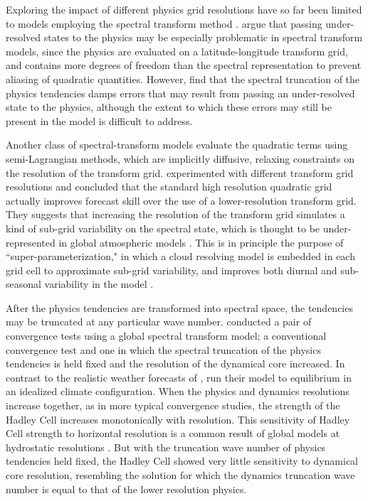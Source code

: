 \documentclass{agujournal}
\begin{document}
Exploring the impact of different physics grid resolutions have so far been limited to models employing the spectral transform method \citep{LH1997MWR,W1999T,W2014PTRSL}. \cite{LH1997MWR} argue that passing under-resolved states to the physics may be especially problematic in spectral transform models, since the physics are evaluated on a latitude-longitude transform grid, and contains more degrees of freedom than the spectral representation to prevent aliasing of quadratic quantities. However, \cite{LH1997MWR} find that the spectral truncation of the physics tendencies damps errors that may result from passing an under-resolved state to the physics, although the extent to which these errors may still be present in the model is difficult to address. 

Another class of spectral-transform models evaluate the quadratic terms using semi-Lagrangian methods, which are implicitly diffusive, relaxing constraints on the resolution of the transform grid. \cite{W2014PTRSL} experimented with different transform grid resolutions and concluded that the standard high resolution quadratic grid actually improves forecast skill over the use of a lower-resolution transform grid. They suggests that increasing the resolution of the transform grid simulates a kind of sub-grid variability on the spectral state, which is thought to be under-represented in global atmospheric models \citep{S2005QJR}. This is in principle the purpose of ``super-parameterization," in which a cloud resolving model is embedded in each grid cell to approximate sub-grid variability, and improves both diurnal and sub-seasonal variability in the model \citep{RKAG2003BAMS}.

After the physics tendencies are transformed into spectral space, the tendencies may be truncated at any particular wave number. \cite{W1999T} conducted a pair of convergence tests using a global spectral transform model; a conventional convergence test and one in which the spectral truncation of the physics tendencies is held fixed and the resolution of the dynamical core increased. In contrast to the realistic weather forecasts of \cite{W2014PTRSL}, \cite{W1999T} run their model to equilibrium in an idealized climate configuration. When the physics and dynamics resolutions increase together, as in more typical convergence studies, the strength of the Hadley Cell increases monotonically with resolution. This sensitivity of Hadley Cell strength to horizontal resolution is a common result of global models at hydrostatic resolutions \citep[see][and references therein]{HR2017JCLIM}. But with the truncation wave number of physics tendencies held fixed, the Hadley Cell showed very little sensitivity to dynamical core resolution, resembling the solution for which the dynamics truncation wave number is equal to that of the lower resolution physics. 
\end{document}
